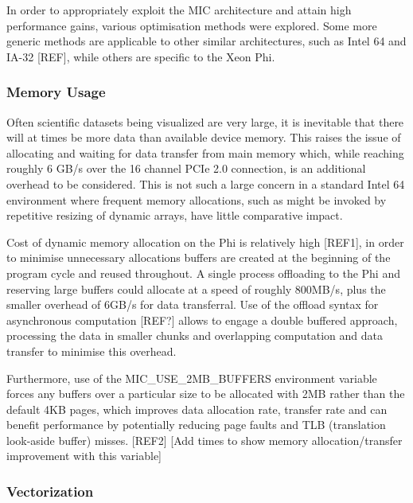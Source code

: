\documentclass{easychair}
\begin{document}
In order to appropriately exploit the MIC architecture and attain high performance gains, various optimisation methods 
were explored. Some more generic methods are applicable to other similar architectures, such as Intel 64 and IA-32 [REF], while 
others are specific to the Xeon Phi. 

\subsubsection{Memory Usage}
\label{sect:memusage}

Often scientific datasets being visualized are very large, it is inevitable that there will at times be more data than 
available device memory. This raises the issue of allocating and waiting for data transfer from main memory which, 
while reaching roughly 6 GB/s over the 16 channel PCIe 2.0 connection, is an additional overhead to be considered.
This is not such a large concern in a standard Intel 64 environment where frequent memory allocations, such as might be 
invoked by repetitive resizing of dynamic arrays, have little comparative impact.

Cost of dynamic memory allocation on the Phi is relatively high [REF1], in order to minimise unnecessary allocations 
buffers are created at the beginning of the program cycle and reused throughout. A single process offloading to the Phi 
and reserving large buffers could allocate at a speed of roughly 800MB/s, plus the smaller overhead of 6GB/s for data 
transferral. Use of the offload syntax for asynchronous computation [REF?] allows to engage a double buffered approach, 
processing the data in smaller chunks and overlapping computation and data transfer to minimise this overhead.

Furthermore, use of the MIC\_USE\_2MB\_BUFFERS environment variable forces any buffers over a particular size to be 
allocated with 2MB rather than the default 4KB pages, which improves data allocation rate, transfer rate and can benefit 
performance by potentially reducing page faults and TLB (translation look-aside buffer) misses. [REF2] [Add times to show 
memory allocation/transfer improvement with this variable]

\subsubsection{Vectorization}
\label{sect:vectorization}
\end{document}
